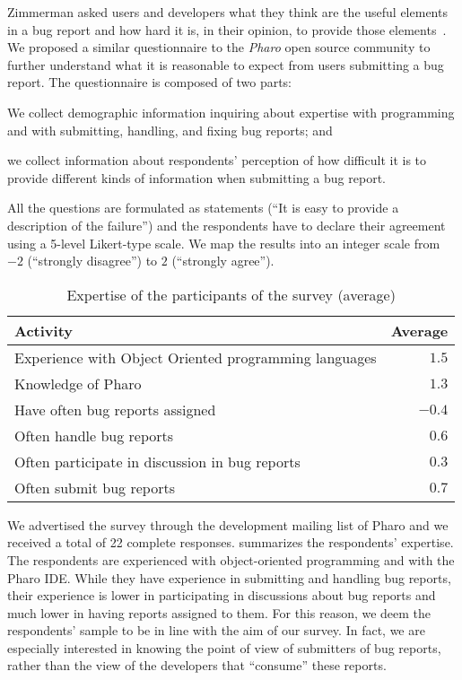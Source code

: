 Zimmerman \etal asked users and developers what they think are the useful elements in a bug report and how hard it is, in their opinion, to provide those elements~\cite{Zimm2010a}.
We proposed a similar questionnaire to the \emph{Pharo} open source community to further understand what it is reasonable to expect from users submitting a bug report.
The questionnaire is composed of two parts: \begin{inparaenum}[(1)]
\item We collect demographic information inquiring about expertise with programming and with submitting, handling, and fixing bug reports; and
\item we collect information about respondents' perception of how difficult it is to provide different kinds of information when submitting a bug report.
\end{inparaenum}
All the questions are formulated as statements (\eg ``It is easy to provide a description of the failure'') and the respondents have to declare their agreement using a 5-level Likert-type scale.
We map the results into an integer scale from $-2$ (\ie ``strongly disagree'') to $2$ (\ie ``strongly agree'').

\begin{table}[t]
\begin{center}
\caption{Expertise of the participants of the survey (average)}\label{tab:survey}
\begin{tabular}{lr}
\rowcolor{tableheader} \textbf{Activity} & \textbf{Average} \\
\hline
Experience with Object Oriented programming languages & $1.5$ \\
Knowledge of Pharo & $1.3$ \\ \hline
Have often bug reports assigned & $-0.4$ \\
Often handle bug reports & $0.6$ \\
Often participate in discussion in bug reports & $0.3$ \\
Often submit bug reports & $0.7$ \\
\hline
\end{tabular}
\label{tab:survey-expertise}
\end{center}
\end{table}

We advertised the survey through the development mailing list of Pharo and we received a total of 22 complete responses.
 summarizes the respondents' expertise.
The respondents are experienced with object-oriented programming and with the Pharo IDE.
While they have experience in submitting and handling bug reports, their experience is lower in participating in discussions about bug reports and much lower in having reports assigned to them.
For this reason, we deem the respondents' sample to be in line with the aim of our survey.
In fact, we are especially interested in knowing the point of view of submitters of bug reports, rather than the view of the developers that ``consume'' these reports.


